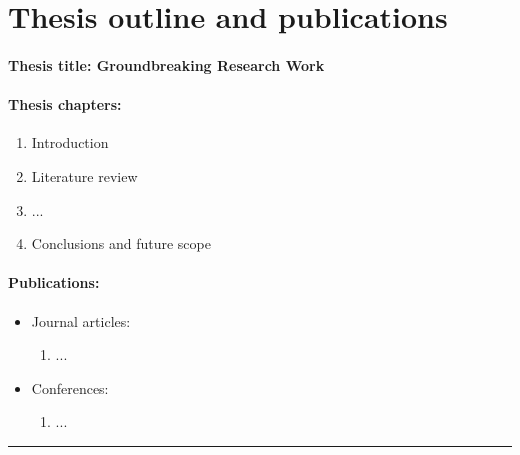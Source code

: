 \chapter{Thesis outline and publications}
\subsubsection{Thesis title: Groundbreaking Research Work}
\subsubsection{Thesis chapters:}
\begin{enumerate}
    \setlength\itemsep{0em}
    \item Introduction
    \item Literature review
    \item ...
    \item Conclusions and future scope
\end{enumerate}
\subsubsection{Publications:}
\begin{itemize}
    \setlength\itemsep{0em}
    \item Journal articles: \begin{enumerate}
                                \setlength\itemsep{0em}
                                \item ...
                            \end{enumerate}
    \item Conferences:  \begin{enumerate}
                            \setlength\itemsep{0em}
                            \item ...
                        \end{enumerate}
\end{itemize}

\fancybreak{{*   *   *}}